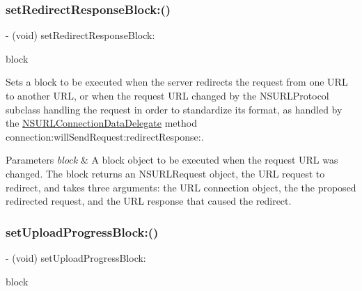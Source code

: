 \subsubsection{\texorpdfstring{set\+Redirect\+Response\+Block\+:()}{setRedirectResponseBlock:()}\hspace{0.1cm}{\footnotesize\ttfamily [3/3]}}
{\footnotesize\ttfamily -\/ (void) set\+Redirect\+Response\+Block\+: \begin{DoxyParamCaption}\item[{(nullable N\+S\+U\+R\+L\+Request $\ast$($^\wedge$)(N\+S\+U\+R\+L\+Connection $\ast$connection, N\+S\+U\+R\+L\+Request $\ast$\mbox{\hyperlink{interface_a_f_u_r_l_connection_operation_a396bdfca5d7ad65dbface0a6df2c207c}{request}}, N\+S\+U\+R\+L\+Response $\ast$redirect\+Response))}]{block }\end{DoxyParamCaption}}

Sets a block to be executed when the server redirects the request from one U\+RL to another U\+RL, or when the request U\+RL changed by the {\ttfamily N\+S\+U\+R\+L\+Protocol} subclass handling the request in order to standardize its format, as handled by the {\ttfamily \mbox{\hyperlink{class_n_s_u_r_l_connection_data_delegate-p}{N\+S\+U\+R\+L\+Connection\+Data\+Delegate}}} method {\ttfamily connection\+:will\+Send\+Request\+:redirect\+Response\+:}.


\begin{DoxyParams}{Parameters}
{\em block} & A block object to be executed when the request U\+RL was changed. The block returns an {\ttfamily N\+S\+U\+R\+L\+Request} object, the U\+RL request to redirect, and takes three arguments\+: the U\+RL connection object, the the proposed redirected request, and the U\+RL response that caused the redirect. \\
\hline
\end{DoxyParams}
\mbox{\label{interface_a_f_u_r_l_connection_operation_a96a234d5491685170008b96f6fd01afb}} 
\subsubsection{\texorpdfstring{set\+Upload\+Progress\+Block\+:()}{setUploadProgressBlock:()}\hspace{0.1cm}{\footnotesize\ttfamily [1/3]}}
{\footnotesize\ttfamily -\/ (void) set\+Upload\+Progress\+Block\+: \begin{DoxyParamCaption}\item[{(nullable void($^\wedge$)(N\+S\+U\+Integer bytes\+Written, long long total\+Bytes\+Written, long long total\+Bytes\+Expected\+To\+Write))}]{block }\end{DoxyParamCaption}}

